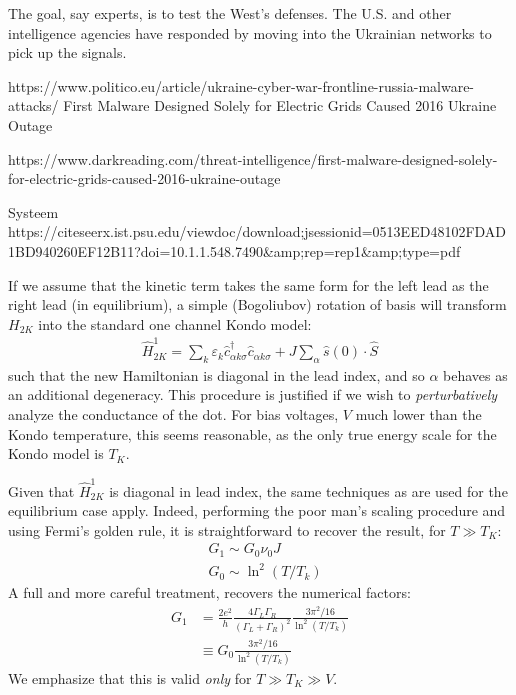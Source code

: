 \documentclass[11pt]{report}
\newcommand{\hH}{\hat{H}}
\newcommand{\D}{^\dagger}
\begin{document}
The goal, say experts, is to test the West’s defenses. The U.S. and other intelligence agencies have responded by moving into the Ukrainian networks to pick up the signals.


https://www.politico.eu/article/ukraine-cyber-war-frontline-russia-malware-attacks/
First Malware Designed Solely for Electric Grids Caused 2016 Ukraine Outage

https://www.darkreading.com/threat-intelligence/first-malware-designed-solely-for-electric-grids-caused-2016-ukraine-outage






Systeem
https://citeseerx.ist.psu.edu/viewdoc/download;jsessionid=0513EED48102FDAD1BD940260EF12B11?doi=10.1.1.548.7490&amp;rep=rep1&amp;type=pdf





If we assume that the kinetic term takes the same form for the left lead as the right lead (in equilibrium), a simple (Bogoliubov) rotation of basis will transform $H_{2K}$ into the standard one channel Kondo model:
\begin{align}\label{kondolies}
  \hH_{2K}^{1}=\sum_{k}\varepsilon_{k}\hat{c}_{\alpha k\sigma}\D\hat{c}_{\alpha k\sigma}+
  J\sum_{\alpha}\hat{s}(0)\cdot\hat{S}
\end{align}
such that the new Hamiltonian is diagonal in the lead index, and so $\alpha$ behaves as an additional degeneracy.  This procedure is justified if we wish to \emph{perturbatively} analyze the conductance of the dot.  For bias voltages, $V$ much lower than the Kondo temperature, this seems reasonable, as the only true energy scale for the Kondo model is $T_{K}$.

Given that $\hH_{2K}^{1}$ is diagonal in lead index, the same techniques as are used for the equilibrium case apply.  Indeed, performing the poor man's scaling procedure and using Fermi's golden rule, it is straightforward to recover the result, for $T\gg T_{K}$:
\begin{align}
  &G_{1}\sim G_{0}\nu_{0}J\nonumber\\
  &G_{0}\sim{\ln^{2}(T/T_{k})}
\end{align}
A full and more careful treatment, recovers the numerical factors:
\begin{align}
  G_{1}&=\frac{2e^{2}}{h}\frac{4\Gamma_{L}\Gamma_{R}}{(\Gamma_{L}+\Gamma_{R})^{2}}\frac{3\pi^{2}/16}{\ln^{2}(T/T_{k})}\nonumber\\
  &\equiv G_{0}\frac{3\pi^{2}/16}{\ln^{2}(T/T_{k})}
\end{align}
We emphasize that this is valid \emph{only} for $T\gg T_{K}\gg V$.
\end{document}
